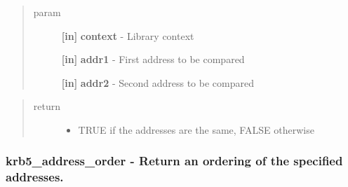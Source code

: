 \documentclass[letterpaper,10pt,english]{sphinxmanual}
\begin{document}
\begin{fulllineitems}
\label{appdev/refs/api/krb5_address_compare:krb5_address_compare}
\end{fulllineitems}

\begin{quote}\begin{description}
\item[{param}] \leavevmode
\textbf{{[}in{]}} \textbf{context} - Library context

\textbf{{[}in{]}} \textbf{addr1} - First address to be compared

\textbf{{[}in{]}} \textbf{addr2} - Second address to be compared

\end{description}\end{quote}
\begin{quote}\begin{description}
\item[{return}] \leavevmode\begin{itemize}
\item {} 
TRUE if the addresses are the same, FALSE otherwise

\end{itemize}

\end{description}\end{quote}


\subsubsection{krb5\_address\_order -  Return an ordering of the specified addresses.}
\label{appdev/refs/api/krb5_address_order:krb5-address-order-return-an-ordering-of-the-specified-addresses}\label{appdev/refs/api/krb5_address_order::doc}

\begin{fulllineitems}
\label{appdev/refs/api/krb5_address_order:krb5_address_order}
\end{fulllineitems}
\end{document}
